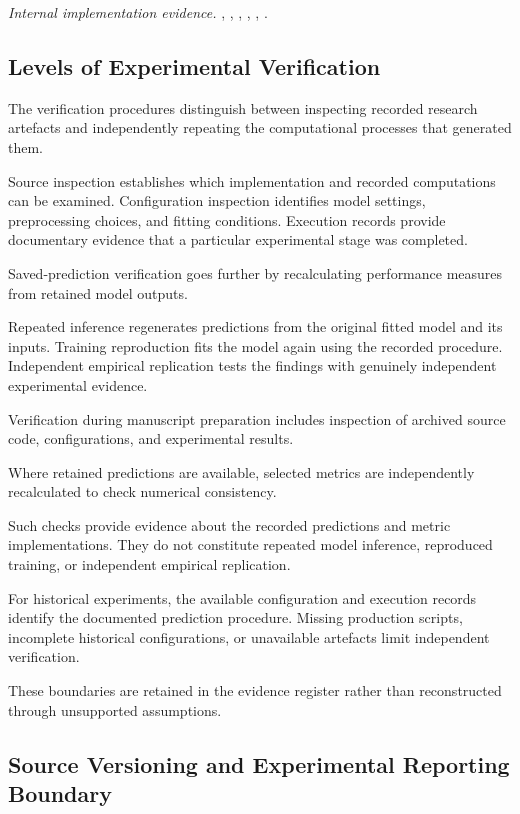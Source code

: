 \noindent\textit{Internal implementation evidence.} , , , , , .

\subsection{Levels of Experimental Verification}

The verification procedures distinguish between inspecting recorded research artefacts and independently repeating the computational processes that generated them.

Source inspection establishes which implementation and recorded computations can be examined. Configuration inspection identifies model settings, preprocessing choices, and fitting conditions. Execution records provide documentary evidence that a particular experimental stage was completed.

Saved-prediction verification goes further by recalculating performance measures from retained model outputs.

Repeated inference regenerates predictions from the original fitted model and its inputs. Training reproduction fits the model again using the recorded procedure. Independent empirical replication tests the findings with genuinely independent experimental evidence.

Verification during manuscript preparation includes inspection of archived source code, configurations, and experimental results.

Where retained predictions are available, selected metrics are independently recalculated to check numerical consistency.

Such checks provide evidence about the recorded predictions and metric implementations. They do not constitute repeated model inference, reproduced training, or independent empirical replication.

For historical experiments, the available configuration and execution records identify the documented prediction procedure. Missing production scripts, incomplete historical configurations, or unavailable artefacts limit independent verification.

These boundaries are retained in the evidence register rather than reconstructed through unsupported assumptions.

\subsection{Source Versioning and Experimental Reporting Boundary}

